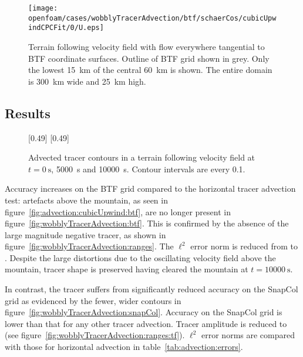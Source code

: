 \begin{figure}
	\centering
	\texttt{[image: openfoam/cases/wobblyTracerAdvection/btf/schaerCos/cubicUpwindCPCFit/0/U.eps]}
%
	\caption{Terrain following velocity field with flow everywhere tangential to BTF coordinate surfaces.  Outline of BTF grid shown in grey.  Only the lowest \SI{15}{\kilo\meter} of the central \SI{60}{\kilo\meter} is shown.  The entire domain is \SI{300}{\kilo\meter} wide and \SI{25}{\kilo\meter} high.}
	\label{fig:wobblyTracer:u}
\end{figure}

\subsection{Results}

\begin{figure}
	\captionsetup[subfigure]{position=b}
	\centering
	[0.49\textwidth]{}
	\hfill
	[0.49\textwidth]{}
%
	\caption{Advected tracer contours in a terrain following velocity field at $t = \SI{0}{\second}$, \SI{5000}{\second} and \SI{10000}{\second}.  Contour intervals are every 0.1.}
\end{figure}

Accuracy increases on the BTF grid compared to the horizontal tracer advection test: artefacts above the mountain, as seen in figure~\ref{fig:advection:cubicUpwind:btf}, are no longer present in figure~\ref{fig:wobblyTracerAdvection:btf}.  This is confirmed by the absence of the large magnitude negative tracer, as shown in figure~\ref{fig:wobblyTracerAdvection:ranges}.  The $\ell^2$ error norm is reduced from  to \unskip.  Despite the large distortions due to the oscillating velocity field above the mountain, tracer shape is preserved having cleared the mountain at $t = \SI{10000}{\second}$.

In contrast, the tracer suffers from significantly reduced accuracy on the SnapCol grid as evidenced by the fewer, wider contours in figure~\ref{fig:wobblyTracerAdvection:snapCol}.  Accuracy on the SnapCol grid is lower than that for any other tracer advection.  Tracer amplitude is reduced to  (see figure~\ref{fig:wobblyTracerAdvection:ranges:tf}).  $\ell^2$ error norms are compared with those for horizontal advection in table~\ref{tab:advection:errors}.

